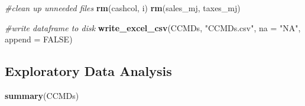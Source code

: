 \documentclass[]{article}
\newenvironment{Shaded}{\begin{snugshade}}{\end{snugshade}}
\newcommand{\CommentTok}[1]{\textcolor[rgb]{0.56,0.35,0.01}{\textit{#1}}}
\newcommand{\DataTypeTok}[1]{\textcolor[rgb]{0.13,0.29,0.53}{#1}}
\newcommand{\KeywordTok}[1]{\textcolor[rgb]{0.13,0.29,0.53}{\textbf{#1}}}
\newcommand{\NormalTok}[1]{#1}
\newcommand{\OtherTok}[1]{\textcolor[rgb]{0.56,0.35,0.01}{#1}}
\newcommand{\StringTok}[1]{\textcolor[rgb]{0.31,0.60,0.02}{#1}}
\begin{document}
\begin{Shaded}
\begin{Highlighting}[]
\CommentTok{#clean up unneeded files}
\KeywordTok{rm}\NormalTok{(cashcol, i)}
\KeywordTok{rm}\NormalTok{(sales_mj, taxes_mj)}

\CommentTok{#write dataframe to disk}
\KeywordTok{write_excel_csv}\NormalTok{(CCMDs, }\StringTok{"CCMDs.csv"}\NormalTok{, }\DataTypeTok{na =} \StringTok{"NA"}\NormalTok{, }\DataTypeTok{append =} \OtherTok{FALSE}\NormalTok{)}
\end{Highlighting}
\end{Shaded}

\hypertarget{exploratory-data-analysis}{%
\subsection{Exploratory Data Analysis}\label{exploratory-data-analysis}}

\begin{Shaded}
\begin{Highlighting}[]
\KeywordTok{summary}\NormalTok{(CCMDs)}
\end{Highlighting}
\end{Shaded}
\end{document}
